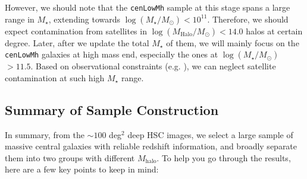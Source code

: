 \documentclass{emulateapj}
\def\nbcg{\texttt{cenLowMh}}
\def\mstar{{$M_{\star}$}}
\def\mhalo{{$M_{\mathrm{halo}}$}}
\def\logms{{$\log (M_{\star}/M_{\odot})$}}
\def\logmh{{$\log (M_{\mathrm{Halo}}/M_{\odot})$}}
\begin{document}
\begin{CJK*}{UTF8}{gbsn}
    However, we should note that the \nbcg{} sample at this stage spans a large range
    in \mstar{}, extending towards \logms{}$<10^{11}$.  
    Therefore, we should expect contamination from satellites in \logmh{}$< 14.0$ halos
    at certain degree.  
    Later, after we update the total \mstar{} of them, we will mainly focus on the 
    \nbcg{} galaxies at high mass end, especially the ones at \logms{}$ > 11.5$. 
    Based on observational constraints (e.g. \citealt{vanUitert2016}), we can neglect 
    satellite contamination at such high \mstar{} range. 

\subsection{Summary of Sample Construction}
    \label{ssec:sample}

    In summary, from the $\sim 100$ deg$^2$ deep HSC images, we select a large sample
    of massive central galaxies with reliable redshift information, and broadly separate 
    them into two groups with different \mhalo{}.  
    To help you go through the results, here are a few key points to keep in mind:
    

\end{CJK*}
\end{document}
